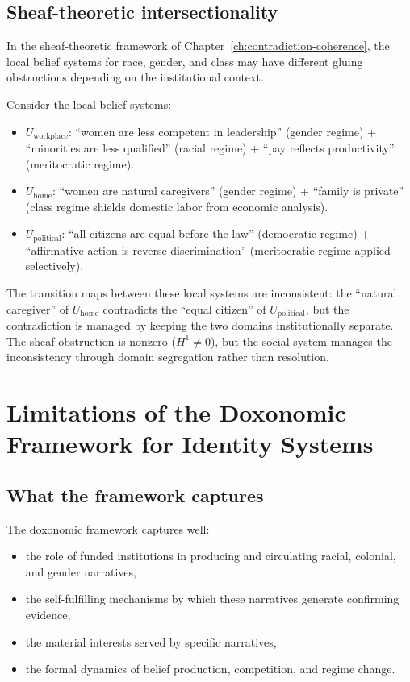 \subsection{Sheaf-theoretic intersectionality}

In the sheaf-theoretic framework of Chapter~\ref{ch:contradiction-coherence}, the local belief systems for race, gender, and class may have different gluing obstructions depending on the institutional context.

\begin{example}
\label{ex:sheaf-intersection}
Consider the local belief systems:
\begin{itemize}[nosep]
  \item $U_{\text{workplace}}$: ``women are less competent in leadership'' (gender regime) + ``minorities are less qualified'' (racial regime) + ``pay reflects productivity'' (meritocratic regime).
  \item $U_{\text{home}}$: ``women are natural caregivers'' (gender regime) + ``family is private'' (class regime shields domestic labor from economic analysis).
  \item $U_{\text{political}}$: ``all citizens are equal before the law'' (democratic regime) + ``affirmative action is reverse discrimination'' (meritocratic regime applied selectively).
\end{itemize}
The transition maps between these local systems are inconsistent: the ``natural caregiver'' of $U_{\text{home}}$ contradicts the ``equal citizen'' of $U_{\text{political}}$, but the contradiction is managed by keeping the two domains institutionally separate.
The sheaf obstruction is nonzero ($H^1 \neq 0$), but the social system manages the inconsistency through domain segregation rather than resolution.
\end{example}

\section{Limitations of the Doxonomic Framework for Identity Systems}
\label{sec:ch24b-limitations}

\subsection{What the framework captures}

The doxonomic framework captures well:
\begin{itemize}[nosep]
  \item the role of funded institutions in producing and circulating racial, colonial, and gender narratives,
  \item the self-fulfilling mechanisms by which these narratives generate confirming evidence,
  \item the material interests served by specific narratives,
  \item the formal dynamics of belief production, competition, and regime change.
\end{itemize}

